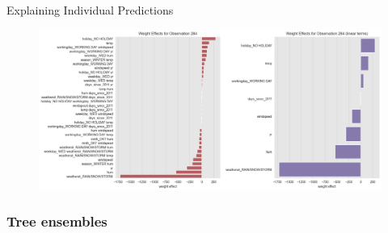 \documentclass[10pt]{beamer}
\begin{document}
\begin{frame}{Explaining Individual Predictions}
\begin{center}
  \begin{figure}
    \includegraphics[scale=0.3]{images/interpretable_ml_72_0.png}
  \end{figure}
\end{center}
\end{frame}

\subsubsection{Tree ensembles}
\end{document}
